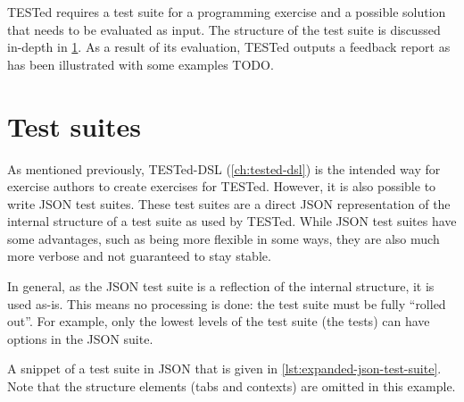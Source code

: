 \documentclass[../main]{subfiles}
\begin{document}
TESTed requires a test suite for a programming exercise and a possible solution that needs to be evaluated as input.
The structure of the test suite is discussed in-depth in \cref{sec:test-suites}.
As a result of its evaluation, TESTed outputs a feedback report as has been illustrated with some examples
TODO.

\section{Test suites}\label{sec:test-suites}

As mentioned previously, TESTed-DSL (\cref{ch:tested-dsl}) is the intended way for exercise authors to create exercises for TESTed.
However, it is also possible to write JSON test suites.
These test suites are a direct JSON representation of the internal structure of a test suite as used by TESTed.
While JSON test suites have some advantages, such as being more flexible in some ways, they are also much more verbose and not guaranteed to stay stable.

In general, as the JSON test suite is a reflection of the internal structure, it is used as-is.
This means no processing is done: the test suite must be fully ``rolled out''.
For example, only the lowest levels of the test suite (the tests) can have options in the JSON suite.

A snippet of a test suite in JSON that is given in \cref{lst:expanded-json-test-suite}.
Note that the structure elements (tabs and contexts) are omitted in this example.

\end{document}
